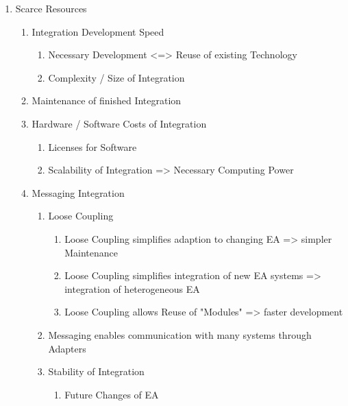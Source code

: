 \documentclass[
     12pt,         %
     a4paper,      %
     BCOR10mm,     %
     DIV14,        %
aragraph skip instad of paragraph indent
     ]{scrreprt}
\begin{document}
\begin{enumerate}
     \item Scarce Resources
           \begin{enumerate}
                \item Integration Development Speed
                      \begin{enumerate}
                           \item Necessary Development <=> Reuse of existing Technology
                           \item Complexity / Size of Integration
                      \end{enumerate}
                \item Maintenance of finished Integration
                \item Hardware / Software Costs of Integration
                      \begin{enumerate}
                           \item Licenses for Software
                           \item Scalability of Integration => Necessary Computing Power
                      \end{enumerate}
                \item Messaging Integration
                      \begin{enumerate}
                           \item Loose Coupling
                                 \begin{enumerate}
                                      \item Loose Coupling simplifies adaption to changing EA => simpler Maintenance
                                      \item Loose Coupling simplifies integration of new EA systems => integration of heterogeneous EA
                                      \item Loose Coupling allows Reuse of "Modules" => faster development
                                 \end{enumerate}
                           \item Messaging enables communication with many systems through Adapters
                           \item Stability of Integration
                                 \begin{enumerate}
                                      \item Future Changes of EA

\end{enumerate}
\end{enumerate}
\end{enumerate}
\end{enumerate}
\end{document}
